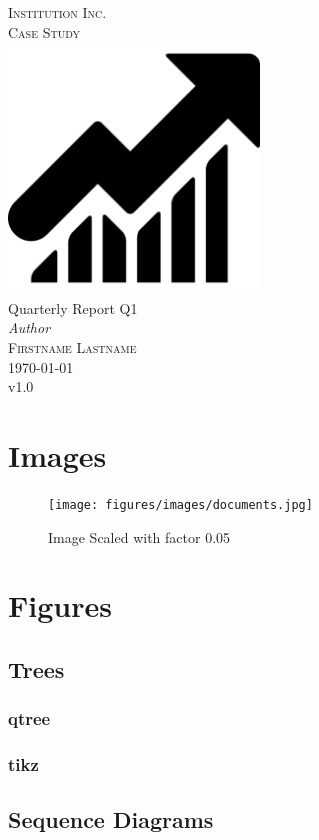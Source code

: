 \documentclass[a4paper, 12pt]{report}
\newcommand{\varDocTitle}{Quarterly Report Q1}
\newcommand{\varDocAuthor}{Firstname Lastname}
\newcommand{\varInstitution}{Institution Inc.}
\newcommand{\varReportType}{Case Study}
\begin{document}
    \begin{titlepage}
        \newcommand{\HRule}{\rule{\linewidth}{0.3mm}}
        \center
        \textsc{\large \varInstitution}\\[1.5cm]
        \textsc{\large \varReportType}\\[1.5cm]
        \includegraphics[width=0.5\textwidth]{figures/images/logo.png}\\[1.5cm]
        {\huge \varDocTitle }\\[2cm]
        {\large\textit{Author}}\\
        \textsc{\varDocAuthor}\\[1cm]
        {\large\today\\v1.0}
    \end{titlepage}

    \tableofcontents

    \chapter{Images}

    \begin{figure}[!htb]
        \centering
        \texttt{[image: figures/images/documents.jpg]}
        \caption{Image Scaled with factor 0.05}
        \label{fig:mobileid-architecture}
    \end{figure}

    \chapter{Figures}

    \section{Trees}

    \subsection{qtree}
    
    \newpage

    \subsection{tikz}
    
    \newpage

    \section{Sequence Diagrams}
    
    \newpage
    
\end{document}
